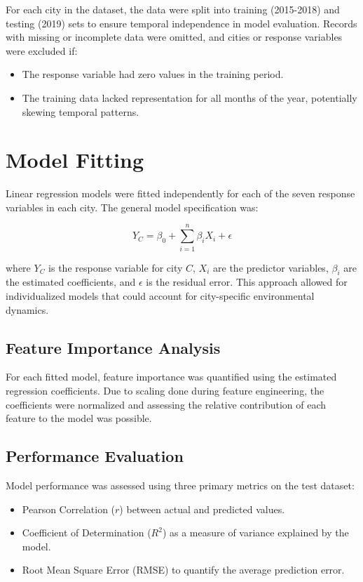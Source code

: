 \documentclass[twoside,11pt]{article}
\begin{document}
For each city in the dataset, the data were split into training (2015-2018) and testing (2019) sets to ensure temporal independence in model evaluation. Records with missing or incomplete data were omitted, and cities or response variables were excluded if:

\begin{itemize}
  \item The response variable had zero values in the training period.
  \item The training data lacked representation for all months of the year, potentially skewing temporal patterns.
\end{itemize}

\section{Model Fitting}

Linear regression models were fitted independently for each of the seven response variables in each city. The general model specification was:

\[
Y_{C} = \beta_{0} + \sum_{i=1}^{n} \beta_{i} X_{i} + \epsilon
\]

where $Y_{C}$ is the response variable for city $C$, $X_{i}$ are the predictor variables, $\beta_{i}$ are the estimated coefficients, and $\epsilon$ is the residual error. This approach allowed for individualized models that could account for city-specific environmental dynamics.

\subsection{Feature Importance Analysis}

For each fitted model, feature importance was quantified using the estimated regression coefficients. Due to scaling done during feature engineering, the coefficients were normalized and assessing the relative contribution of each feature to the model was possible.

\subsection{Performance Evaluation}

Model performance was assessed using three primary metrics on the test dataset:

\begin{itemize}
  \item Pearson Correlation ($r$) between actual and predicted values.
  \item Coefficient of Determination ($R^2$) as a measure of variance explained by the model.
  \item Root Mean Square Error (RMSE) to quantify the average prediction error.
\end{itemize}
\end{document}
